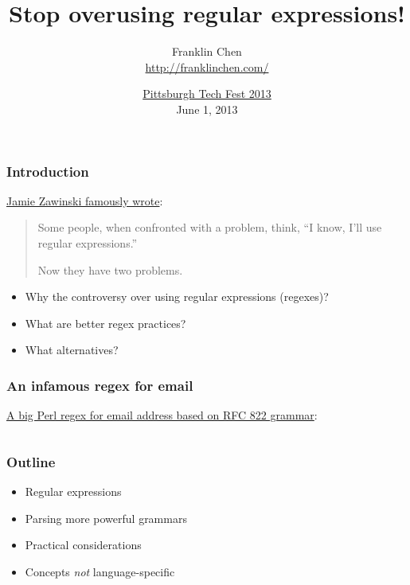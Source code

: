 \usepackage{minted}


\title{Stop overusing regular expressions!}
\author{Franklin Chen \\ \url{http://franklinchen.com/}}
\date{\href{http://www.pghtechfest.com/}{Pittsburgh Tech Fest 2013} \\
June 1, 2013
}



\begin{frame}
  \titlepage
\end{frame}


\begin{frame}
  \frametitle{Introduction}

  \href{http://groups.google.com/forum/?hl=en&fromgroups\#!msg/alt.religion.emacs/DR057Srw5-c/Co-2L2BKn7UJ}{Jamie Zawinski famously wrote}:

  \begin{quotation}
    Some people, when confronted with a problem, think, ``I know, I'll use regular expressions.''

    Now they have two problems.
  \end{quotation}

  \begin{itemize}
    \item<1-> Why the controversy over using regular expressions (regexes)?
    \item<2-> What are better regex practices?
    \item<3-> What alternatives?
  \end{itemize}
\end{frame}

\begin{frame}[fragile]
  \frametitle{An infamous regex for email}

  \href{http://www.ex-parrot.com/pdw/Mail-RFC822-Address.html}{A big Perl regex for email address based on RFC 822 grammar}:

  \inputminted{perl}{extra/rfc-822.pl}
\end{frame}

\begin{frame}
  \frametitle{Outline}

  \begin{itemize}
    \item Regular expressions
    \item Parsing more powerful grammars
    \item Practical considerations
    \item Concepts \emph{not} language-specific
  \end{itemize}
\end{frame}

